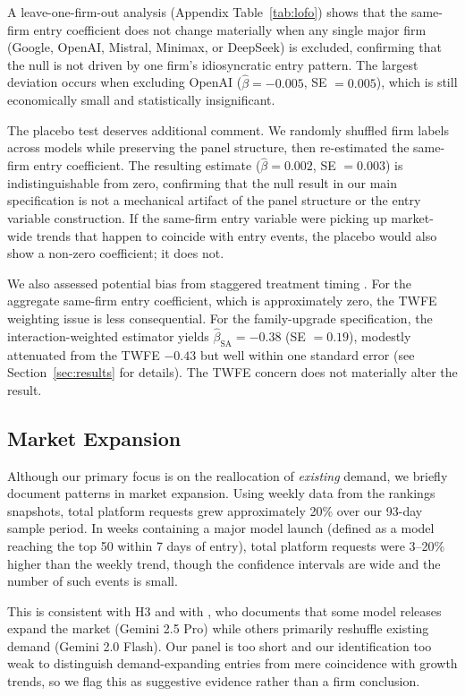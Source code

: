 \documentclass[11pt, a4paper]{article}
\begin{document}
A leave-one-firm-out analysis (Appendix Table~\ref{tab:lofo}) shows that the same-firm entry coefficient does not change materially when any single major firm (Google, OpenAI, Mistral, Minimax, or DeepSeek) is excluded, confirming that the null is not driven by one firm's idiosyncratic entry pattern. The largest deviation occurs when excluding OpenAI ($\hat{\beta} = -0.005$, SE $= 0.005$), which is still economically small and statistically insignificant.

The placebo test deserves additional comment. We randomly shuffled firm labels across models while preserving the panel structure, then re-estimated the same-firm entry coefficient. The resulting estimate ($\hat{\beta} = 0.002$, SE $= 0.003$) is indistinguishable from zero, confirming that the null result in our main specification is not a mechanical artifact of the panel structure or the entry variable construction. If the same-firm entry variable were picking up market-wide trends that happen to coincide with entry events, the placebo would also show a non-zero coefficient; it does not.

We also assessed potential bias from staggered treatment timing \citep{dechaisemartin2020twoway, goodmanbacon2021}. For the aggregate same-firm entry coefficient, which is approximately zero, the TWFE weighting issue is less consequential. For the family-upgrade specification, the \citet{sunAbraham2021} interaction-weighted estimator yields $\hat{\beta}_{\text{SA}} = -0.38$ (SE $= 0.19$), modestly attenuated from the TWFE $-0.43$ but well within one standard error (see Section~\ref{sec:results} for details). The TWFE concern does not materially alter the result.

\subsection{Market Expansion}

Although our primary focus is on the reallocation of \emph{existing} demand, we briefly document patterns in market expansion. Using weekly data from the rankings snapshots, total platform requests grew approximately 20\% over our 93-day sample period. In weeks containing a major model launch (defined as a model reaching the top 50 within 7 days of entry), total platform requests were 3--20\% higher than the weekly trend, though the confidence intervals are wide and the number of such events is small.

This is consistent with H3 and with \citet{fradkin2025demand}, who documents that some model releases expand the market (Gemini 2.5 Pro) while others primarily reshuffle existing demand (Gemini 2.0 Flash). Our panel is too short and our identification too weak to distinguish demand-expanding entries from mere coincidence with growth trends, so we flag this as suggestive evidence rather than a firm conclusion.
\end{document}
